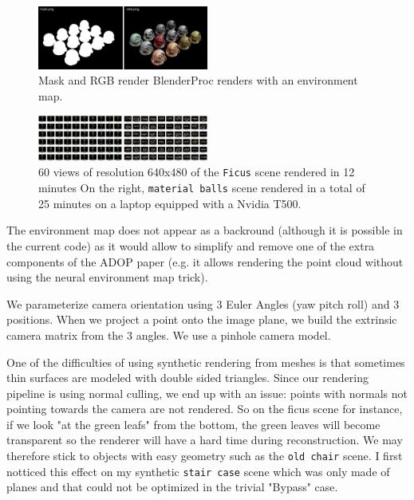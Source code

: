 \begin{figure}[H]
    \centering
    \includegraphics[width=0.5\textwidth]{figures/blenderproc_renders.png}
    \caption{Mask and RGB render BlenderProc renders with an environment map.}
    \label{fig:blenderproc_renders}
\end{figure}

\begin{figure}[H]
    \centering
    \includegraphics[width=0.5\textwidth]{figures/ficus_and_matballs.png}
    \caption{60 views of resolution 640x480 of the \texttt{Ficus} scene rendered in 12 minutes On the right, \texttt{material balls} scene rendered in a total of 25 minutes on a laptop equipped with a Nvidia T500.}
    \label{fig:multiview}
\end{figure}

The environment map does not appear as a backround (although it is possible in the current code) as it would allow to simplify and remove one of the extra components of the ADOP paper (e.g. it allows rendering the point cloud without using the neural environment map trick).

We parameterize camera orientation using 3 Euler Angles (yaw pitch roll) and 3 positions. When we project a point onto the image plane, we build the extrinsic camera matrix from the 3 angles. We use a pinhole camera model.

One of the difficulties of using synthetic rendering from meshes is that sometimes thin surfaces are modeled with double sided triangles. Since our rendering pipeline is using normal culling, we end up with an issue: points with normals not pointing towards the camera are not rendered. So on the ficus scene for instance, if we look "at the green leafs" from the bottom, the green leaves will become transparent so the renderer will have a hard time during reconstruction. We may therefore stick to objects with easy geometry such as the \texttt{old chair} scene. 
I first notticed this effect on my synthetic \texttt{stair case} scene which was only made of planes and that could not be optimized in the trivial "Bypass" case.

